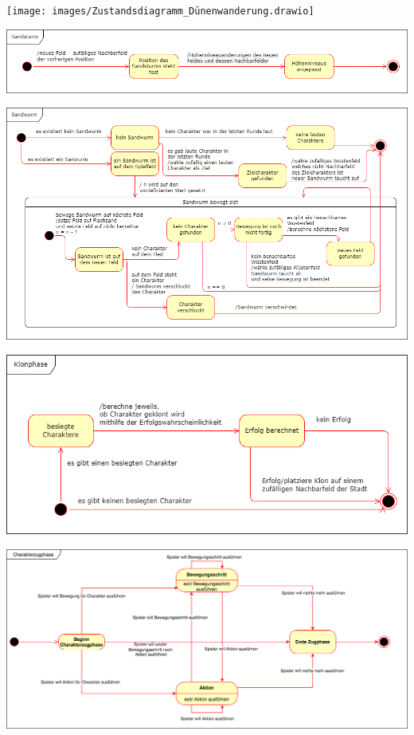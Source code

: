 \documentclass[12pt]{article}
\newcounter{fa}
\begin{document}
\texttt{[image: images/Zustandsdiagramm\_Dünenwanderung.drawio]}
\label{fig:state-mashine-dunechanging}

\includegraphics[width=\textwidth]{images/Zustandsdiagramm_SandSturm.drawio}
\label{fig:state-mashine-sandstorm}

\includegraphics[width=\textwidth]{images/Zustandsdiagramm_SandWurm.drawio}
\label{fig:state-mashine-sandworm}

\includegraphics[width=\textwidth]{images/Zustandsdiagramm_Klonphase.drawio}
\label{fig:state-mashine-clonephase}

\includegraphics[width=\textwidth]{images/Charakterzugphase}
\end{document}
